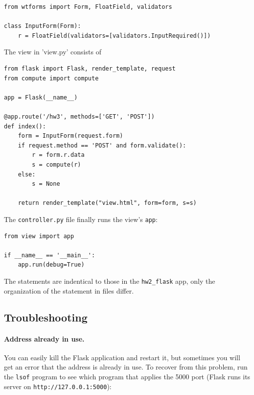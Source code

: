 \documentclass[%
oneside,                 %
final,                   %
10pt]{article}
\begin{document}
\begin{Verbatim}[numbers=none,fontsize=\fontsize{9pt}{9pt},baselinestretch=0.85]
from wtforms import Form, FloatField, validators

class InputForm(Form):
    r = FloatField(validators=[validators.InputRequired()])
\end{Verbatim}

The view in 'view.py' consists of

\begin{Verbatim}[numbers=none,fontsize=\fontsize{9pt}{9pt},baselinestretch=0.85]
from flask import Flask, render_template, request
from compute import compute

app = Flask(__name__)

@app.route('/hw3', methods=['GET', 'POST'])
def index():
    form = InputForm(request.form)
    if request.method == 'POST' and form.validate():
        r = form.r.data
        s = compute(r)
    else:
        s = None

    return render_template("view.html", form=form, s=s)
\end{Verbatim}

The \Verb!controller.py! file finally runs the view's \Verb!app!:

\begin{Verbatim}[numbers=none,fontsize=\fontsize{9pt}{9pt},baselinestretch=0.85]
from view import app

if __name__ == '__main__':
    app.run(debug=True)
\end{Verbatim}

The statements are indentical to those in the \Verb!hw2_flask! app, only
the organization of the statement in files differ.


\subsection{Troubleshooting}


\paragraph{Address already in use.}
You can easily kill the Flask application and restart it, but sometimes
you will get an error that the address is already in use.
To recover from this problem, run the \Verb!lsof! program to see which program
that applies the 5000 port (Flask runs its server on \Verb!http://127.0.0.1:5000!):
\end{document}

